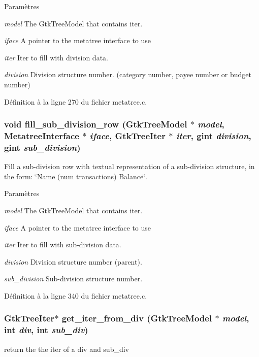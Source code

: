 \begin{DoxyParams}{Paramètres}
\item[{\em model}]The GtkTreeModel that contains iter. \item[{\em iface}]A pointer to the metatree interface to use \item[{\em iter}]Iter to fill with division data. \item[{\em division}]Division structure number. (category number, payee number or budget number) \end{DoxyParams}


Définition à la ligne 270 du fichier metatree.c.

\subsubsection[{fill\_\-sub\_\-division\_\-row}]{\setlength{\rightskip}{0pt plus 5cm}void fill\_\-sub\_\-division\_\-row (GtkTreeModel $\ast$ {\em model}, \/  {\bf MetatreeInterface} $\ast$ {\em iface}, \/  GtkTreeIter $\ast$ {\em iter}, \/  gint {\em division}, \/  gint {\em sub\_\-division})}\label{metatree_8c_a1fcb870c7265355b6468ce6cf4c16d6c}
Fill a sub-\/division row with textual representation of a sub-\/division structure, in the form: \char`\"{}Name (num transactions)
 Balance\char`\"{}.


\begin{DoxyParams}{Paramètres}
\item[{\em model}]The GtkTreeModel that contains iter. \item[{\em iface}]A pointer to the metatree interface to use \item[{\em iter}]Iter to fill with sub-\/division data. \item[{\em division}]Division structure number (parent). \item[{\em sub\_\-division}]Sub-\/division structure number. \end{DoxyParams}


Définition à la ligne 340 du fichier metatree.c.

\subsubsection[{get\_\-iter\_\-from\_\-div}]{\setlength{\rightskip}{0pt plus 5cm}GtkTreeIter$\ast$ get\_\-iter\_\-from\_\-div (GtkTreeModel $\ast$ {\em model}, \/  int {\em div}, \/  int {\em sub\_\-div})}\label{metatree_8c_a88d6f9df7068417b2e7be60fd1968a1a}
return the the iter of a div and sub\_\-div


